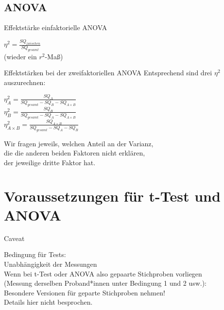 \subsection{ANOVA}

\begin{frame}
  {Effektstärke einfaktorielle ANOVA}

  \begin{center}
    \alert{$\eta^2=\frac{SQ_{zwischen}}{SQ_{gesamt}}$}\\[4ex]
    (wieder ein $r^2$-Maß)
  \end{center}
\end{frame}



\begin{frame}
  {Effektstärken bei der zweifaktoriellen ANOVA}
  Entsprechend sind \alert{drei} $\eta^2$ auszurechnen:\\

  \vspace{0.5cm}
  \begin{center}
    $\eta^2_A=\frac{SQ_A}{SQ_{gesamt} - SQ_B - SQ_{A\times B}}$ \\[3ex]
    $\eta^2_B=\frac{SQ_B}{SQ_{gesamt} - SQ_A - SQ_{A\times B}}$ \\[3ex]
    $\eta^2_{A\times B}=\frac{SQ_{A\times B}}{SQ_{gesamt} - SQ_A - SQ_B}$ \\
  \end{center}

  Wir fragen jeweils, welchen Anteil an der Varianz,\\
  die die anderen beiden Faktoren \alert{nicht} erklären,\\
  der jeweilige dritte Faktor hat.
\end{frame}



\section{Voraussetzungen für t-Test und ANOVA}

\begin{frame}
  {Caveat}
  \Zeile
  \begin{center}
    Bedingung für  Tests:\\
    \alert{Unabhängigkeit} der Messungen \\
    \Zeile
    Wenn bei t-Test oder ANOVA also gepaarte Stichproben vorliegen\\
    (Messung derselben Proband*innen unter Bedingung 1 und 2 usw.):\\
    \alert{Besondere Versionen für geparte Stichproben nehmen!}\\
    \Zeile
    Details hier nicht besprochen.
  \end{center}
\end{frame}


